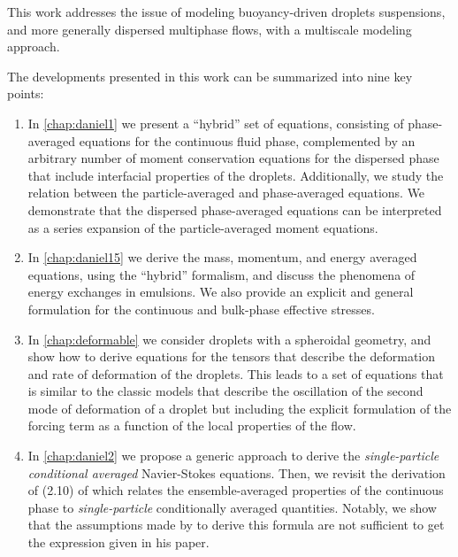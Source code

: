 
This work addresses the issue of modeling buoyancy-driven droplets suspensions, and more generally dispersed multiphase flows, with a multiscale modeling approach. 

The developments presented in this work can be summarized into nine key points:
\begin{enumerate}
    \item 
    In \ref{chap:daniel1} we present a ``hybrid'' set of equations, consisting of phase-averaged equations for the continuous fluid phase, complemented by an arbitrary number of moment conservation equations for the dispersed phase that include interfacial properties of the droplets.
    Additionally, we study the relation between the particle-averaged and phase-averaged equations. 
    We demonstrate that the dispersed phase-averaged equations can be interpreted as a series expansion of the particle-averaged moment equations. 
    \item In \ref{chap:daniel15} we derive the mass, momentum, and energy averaged equations, using the ``hybrid'' formalism, and discuss the phenomena of energy exchanges in emulsions.
    We also provide an explicit and general formulation for the continuous and bulk-phase effective stresses.
    \item In \ref{chap:deformable} we consider droplets with a spheroidal geometry, and show how to derive equations for the tensors that describe the deformation and rate of deformation of the droplets. 
    This leads to a set of equations that is similar to the classic models that describe the oscillation of the second mode of deformation of a droplet but including the explicit formulation of the forcing term as a function of the local properties of the flow. 
    \item     
    In \ref{chap:daniel2} we propose a generic approach to derive the \textit{single-particle conditional averaged} Navier-Stokes equations. 
    Then, we revisit the derivation of (2.10) of \citet{batchelor1972sedimentation} which relates the ensemble-averaged properties of the continuous phase to \textit{single-particle} conditionally averaged quantities.
    Notably, we show that the assumptions made by \citet{batchelor1972sedimentation} to derive this formula are not sufficient to get the expression given in his paper.

\end{enumerate}
